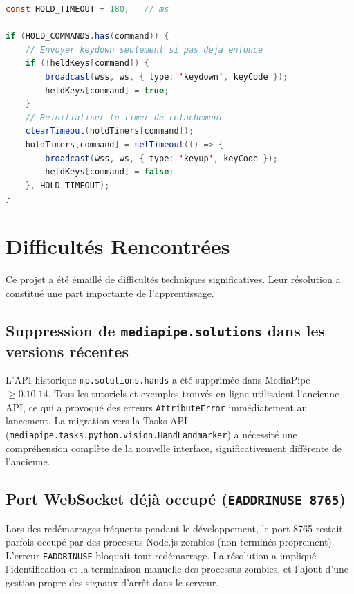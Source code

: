 \documentclass[12pt, a4paper]{article}
\newcommand{\code}[1]{\texttt{\small #1}}
\begin{document}
\begin{lstlisting}[caption={Mécanisme hold timer dans \texttt{server.js} (Node.js)},
                   label=lst:holdtimer,
                   language=Java]
const HOLD_TIMEOUT = 180;   // ms

if (HOLD_COMMANDS.has(command)) {
    // Envoyer keydown seulement si pas deja enfonce
    if (!heldKeys[command]) {
        broadcast(wss, ws, { type: 'keydown', keyCode });
        heldKeys[command] = true;
    }
    // Reinitialiser le timer de relachement
    clearTimeout(holdTimers[command]);
    holdTimers[command] = setTimeout(() => {
        broadcast(wss, ws, { type: 'keyup', keyCode });
        heldKeys[command] = false;
    }, HOLD_TIMEOUT);
}
\end{lstlisting}

\section{Difficultés Rencontrées}
\label{sec:difficultes}

Ce projet a été émaillé de difficultés techniques significatives. Leur résolution
a constitué une part importante de l'apprentissage.

\subsection{Suppression de \texttt{mediapipe.solutions} dans les versions récentes}

L'API historique \code{mp.solutions.hands} a été supprimée dans
MediaPipe \(\geq 0.10.14\). Tous les tutoriels et exemples trouvés en ligne
utilisaient l'ancienne API, ce qui a provoqué des erreurs \code{AttributeError}
immédiatement au lancement. La migration vers la Tasks API
(\code{mediapipe.tasks.python.vision.HandLandmarker}) a nécessité une compréhension
complète de la nouvelle interface, significativement différente de l'ancienne.

\subsection{Port WebSocket déjà occupé (\texttt{EADDRINUSE 8765})}

Lors des redémarrages fréquents pendant le développement, le port 8765 restait
parfois occupé par des processus Node.js zombies (non terminés proprement).
L'erreur \code{EADDRINUSE} bloquait tout redémarrage. La résolution a impliqué
l'identification et la terminaison manuelle des processus zombies, et l'ajout
d'une gestion propre des signaux d'arrêt dans le serveur.
\end{document}
